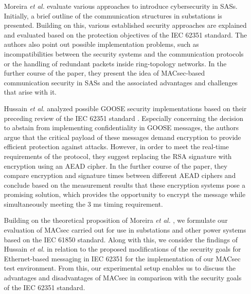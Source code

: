 \documentclass[conference, onecolumn, a4paper]{IEEEtran}
\begin{document}
\smallskip
Moreira \textit{et al.} \cite{Cybersecurity_Substation:2016} evaluate various approaches to introduce cybersecurity in SASs. Initially, a brief outline 
of the communication structures in substations is presented. Building on this, various established security approaches are explained and evaluated based 
on the protection objectives of the IEC 62351 standard. The authors also point out possible implementation problems, such as incompatibilities between 
the security systems and the communication protocols or the handling of redundant packets inside ring-topology networks. In the further course of the 
paper, they present the idea of MACsec-based communication security in SASs and the associated advantages and challenges that arise with it. 

\smallskip
Hussain \textit{et al.} \cite{GOOSE_confidentiality_integrity:2020} analyzed possible GOOSE security implementations based on their preceding review 
of the IEC 62351 standard \cite{Review_IEC62351:2019}. Especially concerning the decision to abstain from implementing confidentiality in GOOSE messages, 
the authors argue that the critical payload of these messages demand encryption to provide efficient protection against attacks. However, in order to 
meet the real-time requirements of the protocol, they suggest replacing the RSA signature with encryption using an AEAD cipher. In the further course 
of the paper, they compare encryption and signature times between different AEAD ciphers and conclude based on the measurement results that these encryption 
systems pose a promising solution, which provides the opportunity to encrypt the message while simultaneously  meeting the 3 ms timing requirement.

\smallskip 
Building on the theoretical proposition of Moreira \textit{et al.} \cite{Cybersecurity_Substation:2016}, we formulate our evaluation of MACsec carried 
out for use in substations and other power systems based on the IEC 61850 standard. Along with this, we consider the findings of Hussain \textit{et al.} 
\cite{Review_IEC62351:2019} in relation to the proposed modifications of the security goals for Ethernet-based messaging in IEC 62351 for the implementation 
of our MACsec test environment. From this, our experimental setup enables us to discuss the advantages and disadvantages of MACsec in comparison with the 
security goals of the IEC 62351 standard. 

\end{document}
